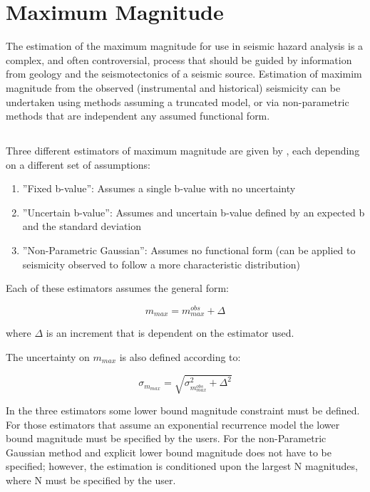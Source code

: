 \section{Maximum Magnitude}

The estimation of the maximum magnitude for use in seismic hazard analysis is a complex, and often controversial, process that should be guided by information from geology and the seismotectonics of a seismic source. Estimation of maximim magnitude from the observed (instrumental and historical) seismicity can be undertaken using methods assuming a truncated \cite{GutenbergRichter1944} model, or via non-parametric methods that are independent any assumed functional form. 

\subsection{\textcite{Kijko2004}}

Three different estimators of maximum magnitude are given by \textcite{Kijko2004}, each depending on a different set of assumptions:
\begin{enumerate}
\item ''Fixed b-value'': Assumes a single b-value with no uncertainty 
\item ''Uncertain b-value'': Assumes and uncertain b-value defined by an expected b and the standard deviation
\item ''Non-Parametric Gaussian'': Assumes no functional form (can be applied to seismicity observed to follow a more characteristic distribution)
\end{enumerate}

Each of these estimators assumes the general form:

\begin{equation}
m_{max} = m_{max}^{obs} + \Delta
\end{equation}

where $\Delta$ is an increment that is dependent on the estimator used.

The uncertainty on $m_{max}$ is also defined according to:

\begin{equation}
    \sigma_{m_{max}} = \sqrt{\sigma_{m_{max}^{obs}}^2 + \Delta^{2}}
\end{equation}

In the three estimators some lower bound magnitude constraint must be defined. For those estimators that assume an exponential recurrence model the lower bound magnitude must be specified by the users. For the non-Parametric Gaussian method and explicit lower bound magnitude does not have to be specified; however, the estimation is conditioned upon the largest N magnitudes, where N must be specified by the user.

